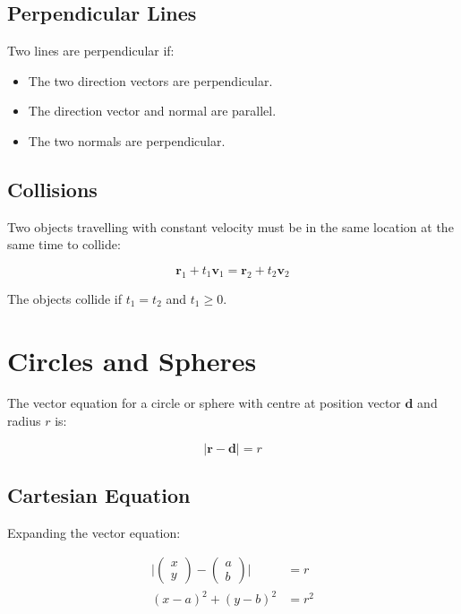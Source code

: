 \documentclass[a4paper,11pt]{article}
\newcommand{\bb}{\boldsymbol}
\begin{document}
\subsection{Perpendicular Lines}

Two lines are perpendicular if:

\begin{itemize}
\item The two direction vectors are perpendicular.
\item The direction vector and normal are parallel.
\item The two normals are perpendicular.
\end{itemize}


\subsection{Collisions}

Two objects travelling with constant velocity must be in the same location at
the same time to collide:

$$
\bb{r}_1 + t_1 \bb{v}_1 = \bb{r}_2 + t_2 \bb{v}_2
$$

The objects collide if $t_1 = t_2$ and $t_1 \geq 0$.




\section{Circles and Spheres}

The vector equation for a circle or sphere with centre at position vector
$\bb{d}$ and radius $r$ is:

$$
\lvert \bb{r} - \bb{d} \rvert = r
$$


\subsection{Cartesian Equation}

Expanding the vector equation:

$$
\begin{aligned}
\lvert \begin{pmatrix} x \\ y \end{pmatrix} - \begin{pmatrix} a \\ b \end{pmatrix} \rvert & = r \\
(x - a)^2 + (y - b)^2 & = r^2 \\
\end{aligned}
$$
\end{document}
